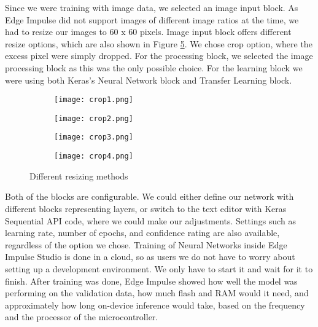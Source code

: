 Since we were training with image data, we selected an image input block. 
As Edge Impulse did not support images of different image ratios at the time, we had to resize our images to 60 x 60 pixels.
Image input block offers different resize options, which are also shown in Figure \ref{crop_options}.
We chose crop option, where the excess pixel were simply dropped.
For the processing block, we selected the image processing block as this was the only possible choice.
For the learning block we were using both Keras's Neural Network block and Transfer Learning block.
\newline
\begin{figure}[ht]
    \begin{subfigure}{0.5\textwidth}
        \raggedleft
        \texttt{[image: crop1.png]} 
        \label{crop1}
    \end{subfigure}
    \begin{subfigure}{0.5\textwidth}
        \raggedright 
        \texttt{[image: crop2.png]} 
        \label{crop2}
    \end{subfigure}
    \begin{subfigure}{0.5\textwidth}
        \raggedleft
        \texttt{[image: crop3.png]} 
        \label{crop3}
    \end{subfigure}
    \begin{subfigure}{0.5\textwidth}
        \raggedright 
        \texttt{[image: crop4.png]} 
        \label{crop4}
    \end{subfigure}
\caption{ Different resizing methods}
    \label{crop_options}
\end{figure}
\clearpage
Both of the blocks are configurable.
We could either define our network with different blocks representing layers, or switch to the text editor with Keras Sequential API code, where we could make our adjustments.
Settings such as learning rate, number of epochs\footnotemark, and confidence rating are also available, regardless of the option we chose.
Training of Neural Networks inside Edge Impulse Studio is done in a cloud, so as users we do not have to worry about setting up a development environment.
We only have to start it and wait for it to finish.
After training was done, Edge Impulse showed how well the model was performing on the validation data, how much flash and RAM would it need, and approximately how long on-device inference would take, based on the frequency and the processor of the microcontroller.


